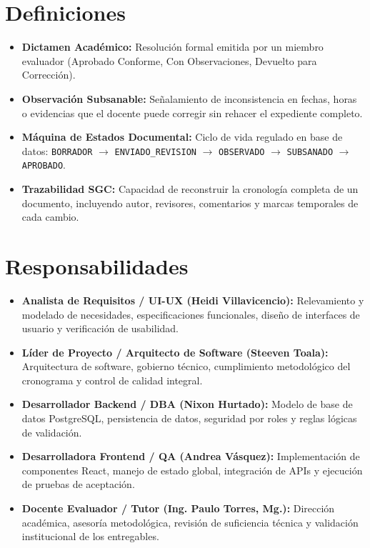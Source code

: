 \documentclass[12pt,a4paper]{article}
\begin{document}
\section{Definiciones}
\begin{itemize}[leftmargin=1.5em, itemsep=2pt]
    \item \textbf{Dictamen Académico:} Resolución formal emitida por un miembro evaluador (Aprobado Conforme, Con Observaciones, Devuelto para Corrección).
    \item \textbf{Observación Subsanable:} Señalamiento de inconsistencia en fechas, horas o evidencias que el docente puede corregir sin rehacer el expediente completo.
    \item \textbf{Máquina de Estados Documental:} Ciclo de vida regulado en base de datos: \texttt{BORRADOR} $\rightarrow$ \texttt{ENVIADO\_REVISION} $\rightarrow$ \texttt{OBSERVADO} $\rightarrow$ \texttt{SUBSANADO} $\rightarrow$ \texttt{APROBADO}.
    \item \textbf{Trazabilidad SGC:} Capacidad de reconstruir la cronología completa de un documento, incluyendo autor, revisores, comentarios y marcas temporales de cada cambio.
\end{itemize}

\section{Responsabilidades}
\begin{itemize}[leftmargin=1.5em, itemsep=2pt]
    \item \textbf{Analista de Requisitos / UI-UX (Heidi Villavicencio):} Relevamiento y modelado de necesidades, especificaciones funcionales, diseño de interfaces de usuario y verificación de usabilidad.
    \item \textbf{Líder de Proyecto / Arquitecto de Software (Steeven Toala):} Arquitectura de software, gobierno técnico, cumplimiento metodológico del cronograma y control de calidad integral.
    \item \textbf{Desarrollador Backend / DBA (Nixon Hurtado):} Modelo de base de datos PostgreSQL, persistencia de datos, seguridad por roles y reglas lógicas de validación.
    \item \textbf{Desarrolladora Frontend / QA (Andrea Vásquez):} Implementación de componentes React, manejo de estado global, integración de APIs y ejecución de pruebas de aceptación.
    \item \textbf{Docente Evaluador / Tutor (Ing. Paulo Torres, Mg.):} Dirección académica, asesoría metodológica, revisión de suficiencia técnica y validación institucional de los entregables.
\end{itemize}
\end{document}
